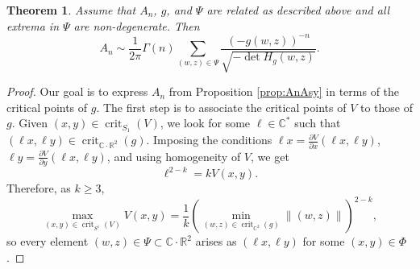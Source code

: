 \documentclass[english]{ourlematemasingle}
\newtheorem{theorem}{Theorem}
\numberwithin{theorem}{section}
\theoremstyle{remark}
\newcommand{\R}{\mathbb{R}}
\newcommand{\C}{\mathbb{C}}
\DeclareMathOperator{\crit}{crit}
\begin{document}
\begin{theorem}\label{thm:crit_g}
    Assume that $A_n$, $g$, and $\Psi$ are related as described above and all extrema in $\Psi$ are non-degenerate. Then 
    \begin{equation}
    \label{eq:niceFormula}
    A_n \sim 
    \frac{1}{2\pi}
    \Gamma(n)
    \sum\limits_{(w,z) \in \Psi} \frac{(-g(w,z))^{-n}}{\sqrt{-\det H_g(w,z)}}.
    \end{equation}
\end{theorem}
\begin{proof}
    Our goal is to express $A_n$ from Proposition \ref{prop:AnAsy} in terms of the critical points of $g$. The first step is to associate the critical points of $V$ to those of $g$. 
    Given $(x,y)\in\crit_{S_1}(V)$, we look for some $\ell \in \C^*$ such that $(\ell x, \ell y)\in\operatorname{crit}_{\C\cdot\R^2}(g)$. Imposing the conditions $\ell x = \frac{\partial V}{\partial x}(\ell x,\ell y)$, $\ell y = \frac{\partial V}{\partial y}(\ell x,\ell y)$, and using homogeneity of $V$, we get 
    \begin{equation}
        \label{eq:ellRoots}
        \ell^{2-k} = k V(x,y).
    \end{equation}
    Therefore, as $k \geq 3$,
    \[
    \max_{(x,y)\in \operatorname{crit}_{S^1}(V)} V(x,y) = \frac{1}{k} \left( \min_{(w,z)\in \operatorname{crit}_{\C^2}(g)} \|(w,z)\| \right)^{2-k},
    \]
    so every element $(w,z)\in\Psi\subset \C\cdot\R^2$ arises as $(\ell x,\ell y)$ for some $(x,y)\in\Phi$.


\end{proof}
\end{document}
